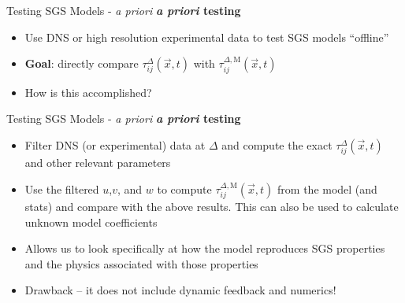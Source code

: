 
\begin{frame}{Testing SGS Models - \textit{a priori}}
\textbf{\textit{a priori} testing}
\begin{itemize}
	\item Use DNS or high resolution experimental data to test SGS models ``offline''
	\item \textbf{Goal}: directly compare $\tau_{ij}^{\Delta} (\vec{x}, t)$ with $\tau_{ij}^{\Delta, \text{M}} (\vec{x}, t)$
	\item How is this accomplished?
\end{itemize}

\end{frame}


\begin{frame}{Testing SGS Models - \textit{a priori}}
\textbf{\textit{a priori} testing}
\begin{itemize}
	\item Filter DNS (or experimental) data at $\Delta$ and compute the exact $\tau_{ij}^{\Delta} (\vec{x}, t)$ and other relevant parameters
	\item Use the filtered $u$,$v$, and $w$ to compute $\tau_{ij}^{\Delta, \text{M}} (\vec{x}, t)$ from the model (and stats) and compare with the above results. This can also be used to calculate unknown model coefficients
	\item Allows us to look specifically at how the model reproduces SGS properties and the physics associated with those properties
	\item Drawback -- it does not include dynamic feedback and numerics!
\end{itemize}

\end{frame}


